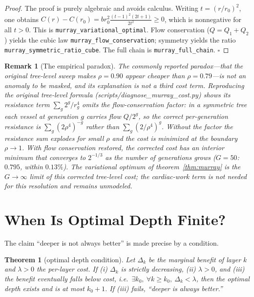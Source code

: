 \documentclass[conference]{IEEEtran}
\newtheorem{theorem}{Theorem}
\newtheorem{remark}{Remark}
\begin{document}
\begin{proof}
The proof is purely algebraic and avoids calculus. Writing
$t=(r/r_0)^2$, one obtains
$C(r)-C(r_0)=br_0^2\frac{(t-1)^2(2t+1)}{2t^2}\ge0$,
which is nonnegative for all $t>0$. This is \texttt{murray\_variational\_optimal}.
Flow conservation ($Q=Q_1+Q_2$) yields the cubic law
\texttt{murray\_flow\_conservation}; symmetry yields the ratio
\texttt{murray\_symmetric\_ratio\_cube}. The full chain is
\texttt{murray\_full\_chain}. \hfill$\square$
\end{proof}

\begin{remark}[The empirical paradox]
\label{rem:paradox}
The commonly reported paradox---that the original tree-level sweep makes
$\rho=0.90$ appear cheaper than $\rho=0.79$---is not an anomaly to be masked,
and its explanation is not a third cost term. Reproducing the original
tree-level formula (scripts/diagnose\_murray\_cost.py) shows its resistance
term $\sum_g 2^g/r_g^4$ omits the flow-conservation factor: in a symmetric
tree each vessel at generation $g$ carries flow $Q/2^g$, so the correct
per-generation resistance is $\sum_g (2\rho^4)^{-g}$ rather than
$\sum_g (2/\rho^4)^g$. Without the factor the resistance sum explodes for small
$\rho$ and the cost is minimized at the boundary $\rho\to1$. With flow
conservation restored, the corrected cost has an interior minimum that
converges to $2^{-1/3}$ as the number of generations grows ($G{=}50$:
$0.795$, within $0.13\%$). The variational optimum of
theorem~\ref{thm:murray} is the $G\to\infty$ limit of this corrected
tree-level cost; the cardiac-work term is not needed for this resolution and
remains unmodeled.
\end{remark}

\section{When Is Optimal Depth Finite?}
\label{sec:depth}
The claim ``deeper is not always better'' is made precise by a condition.

\begin{theorem}[optimal depth condition]
\label{thm:depth}
Let $\Delta_k$ be the marginal benefit of layer $k$ and $\lambda>0$ the per-layer
cost. If (i) $\Delta_k$ is strictly decreasing, (ii) $\lambda>0$, and (iii) the
benefit eventually falls below cost, i.e.\ $\exists k_0,\ \forall k\ge k_0,\
\Delta_k<\lambda$, then the optimal depth exists and is at most $k_0+1$. If
(iii) fails, ``deeper is always better.''
\end{theorem}
\end{document}
